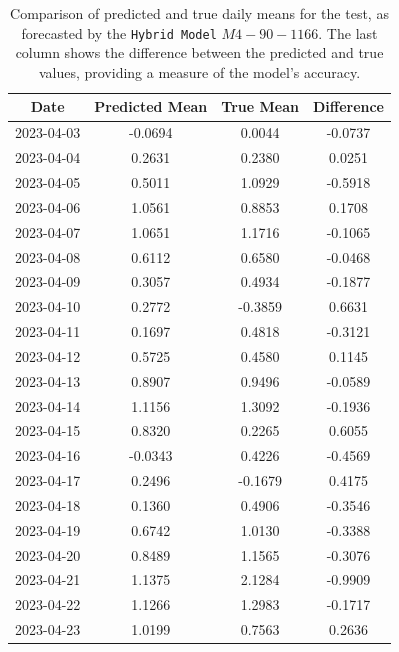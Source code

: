 \begin{table}[h]
\centering
\caption{Comparison of predicted and true daily means for the test, as forecasted by the \texttt{Hybrid Model} $M4{-}90{-}1166$. The last column shows the difference between the predicted and true values, providing a measure of the model's accuracy.}
\label{tab:hybrid_preds}
\begin{tabular}{cccc}
\toprule
Date       & Predicted Mean & True Mean & Difference \\ \midrule
2023-04-03 & -0.0694       & 0.0044    & -0.0737    \\
2023-04-04 & 0.2631        & 0.2380    & 0.0251     \\
2023-04-05 & 0.5011        & 1.0929    & -0.5918    \\
2023-04-06 & 1.0561        & 0.8853    & 0.1708     \\
2023-04-07 & 1.0651        & 1.1716    & -0.1065    \\
2023-04-08 & 0.6112        & 0.6580    & -0.0468    \\
2023-04-09 & 0.3057        & 0.4934    & -0.1877    \\
2023-04-10 & 0.2772        & -0.3859   & 0.6631     \\
2023-04-11 & 0.1697        & 0.4818    & -0.3121    \\
2023-04-12 & 0.5725        & 0.4580    & 0.1145     \\
2023-04-13 & 0.8907        & 0.9496    & -0.0589    \\
2023-04-14 & 1.1156        & 1.3092    & -0.1936    \\
2023-04-15 & 0.8320        & 0.2265    & 0.6055     \\
2023-04-16 & -0.0343       & 0.4226    & -0.4569    \\
2023-04-17 & 0.2496        & -0.1679   & 0.4175     \\
2023-04-18 & 0.1360        & 0.4906    & -0.3546    \\
2023-04-19 & 0.6742        & 1.0130    & -0.3388    \\
2023-04-20 & 0.8489        & 1.1565    & -0.3076    \\
2023-04-21 & 1.1375        & 2.1284    & -0.9909    \\
2023-04-22 & 1.1266        & 1.2983    & -0.1717    \\
2023-04-23 & 1.0199        & 0.7563    & 0.2636     \\ \bottomrule
\end{tabular}
\end{table}


